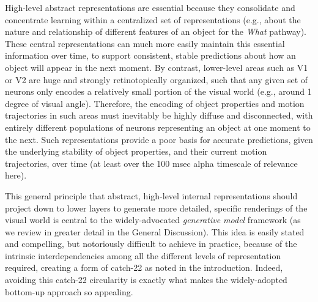 \documentclass[11pt,twoside]{article}
\newif\myifpdf
\begin{document}
High-level abstract representations are essential because they consolidate and concentrate learning within a centralized set of representations (e.g., about the nature and relationship of different features of an object for the {\em What} pathway).  These central representations can much more easily maintain this essential information over time, to support consistent, stable predictions about how an object will appear in the next moment.  By contrast, lower-level areas such as V1 or V2 are huge and strongly retinotopically organized, such that any given set of neurons only encodes a relatively small portion of the visual world (e.g., around 1 degree of visual angle).  Therefore, the encoding of object properties and motion trajectories in such areas must inevitably be highly diffuse and disconnected, with entirely different populations of neurons representing an object at one moment to the next.  Such representations provide a poor basis for accurate predictions, given the underlying stability of object properties, and their current motion trajectories, over time (at least over the 100 msec alpha timescale of relevance here).

This general principle that abstract, high-level internal representations should project down to lower layers to generate more detailed, specific renderings of the visual world is central to the widely-advocated {\em generative model} framework \cite[e.g.,]{CarpenterGrossberg87,Mumford92,KawatoHayakawaInui93,Ullman95,DayanHintonNealEtAl95,RaoBallard99,LeeMumford03,Friston05,HintonSalakhutdinov06,YuilleKersten06,Friston08,Friston10,Lee15,Clark13,Valpola14,RasmusBerglundHonkalaEtAl15} (as we review in greater detail in the General Discussion).  This idea is easily stated and compelling, but notoriously difficult to achieve in practice, because of the intrinsic interdependencies among all the different levels of representation required, creating a form of catch-22 as noted in the introduction.  Indeed, avoiding this catch-22 circularity is exactly what makes the widely-adopted bottom-up approach so appealing.
\end{document}
